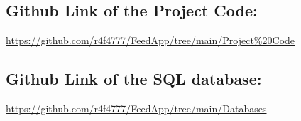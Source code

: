 \subsection*{Github Link of the Project Code:}
\url{https://github.com/r4f4777/FeedApp/tree/main/Project%20Code }

\subsection*{Github Link of the SQL database:}
\url{https://github.com/r4f4777/FeedApp/tree/main/Databases }